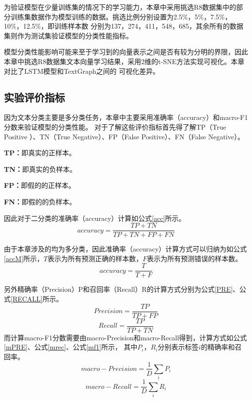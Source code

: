 为验证模型在少量训练集的情况下的学习能力，本章中采用挑选R8数据集中的部分训练集数据作为模型训练的数据。挑选比例分别设置为2.5\%，5\%，7.5\%，10\%，12.5\%，即训练样本数
分别为137，274，411，548，685，其余所有的数据集则作为测试集验证模型的分类性能指标。

模型分类性能影响可能来至于学习到的向量表示之间是否有较为分明的界限，因此本章中挑选R8数据集文本向量学习结果，采用2维的t-SNE方法实现可视化。本章对比了LSTM模型和TextGraph之间的
可视化差异。
\subsection{实验评价指标}
因为文本分类主要是多分类任务，本章中主要采用准确率（accuracy）和macro-F1分数来验证模型的分类性能。
对于了解这些评价指标首先得了解TP（True Positive ）、TN（True Negative）、FP（False Positive）、FN（False Negative）。

\textbf{TP：}即真实的正样本。

\textbf{TN：}即真实的负样本。

\textbf{FP：}即假的的正样本。

\textbf{FN：}即假的的负样本。

因此对于二分类的准确率（accuracy）计算如公式\ref{acc}所示。
\begin{equation}\label{acc}
    accuracy=\frac{TP+TN}{TP+TN+FP+FN}
\end{equation}

由于本章涉及的均为多分类，因此准确率（accuracy）计算方式可以归纳为如公式\ref{accM}所示，$T$表示为所有预测正确的样本数，$F$表示为所有预测错误的样本数。
\begin{equation}\label{accM}
    accuracy=\frac{T}{T+F}
\end{equation}

另外精确率（Precision）P和召回率（Recall）R的计算方式分别为公式\ref{PRE}、公式\ref{RECALL}所示。
\begin{equation}\label{PRE}
    Precision=\frac{TP}{TP+FP}
\end{equation}
\begin{equation}\label{RECALL}
    Recall=\frac{TP}{TP+TN}
\end{equation}
而计算macro-F1分数需要由macro-Precision和macro-Recall得到，计算方式如公式\ref{mPRE}、公式\ref{mrec}、公式\ref{mf1}所示，
其中$P_i$，$R_i$分别表示标签$i$的精确率和召回率。
\begin{equation}\label{mPRE}
    macro-Precision=\frac{1}{D}\sum_{i}{P_i}
\end{equation}
\begin{equation}\label{mrec}
    macro-Recall=\frac{1}{D}\sum_{i}{R_i}
\end{equation}

